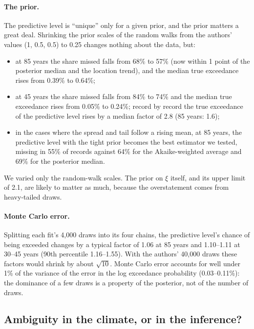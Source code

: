 \documentclass[11pt]{article}
\begin{document}
\paragraph{The prior.}\label{sec:pred-prior}

The predictive level is ``unique'' only for a given prior, and the prior matters a great deal.
Shrinking the prior scales of the random walks from the authors' values (1, 0.5, 0.5) to 0.25
changes nothing about the data, but:
\begin{itemize}
\item at 85 years the share missed falls from 68\% to 57\% (now within 1 point of the posterior
  median and the location trend), and the median true exceedance rises from 0.39\% to 0.64\%;
\item at 45 years the share missed falls from 84\% to 74\% and the median true exceedance rises from
  0.05\% to 0.24\%; record by record the true exceedance of the predictive level rises by a median
  factor of 2.8 (85 years: 1.6);
\item in the cases where the spread and tail follow a rising mean, at 85 years, the predictive level
  with the tight prior becomes the best estimator we tested, missing in 55\% of records against 64\%
  for the Akaike-weighted average and 69\% for the posterior median.
\end{itemize}
We varied only the random-walk scales. The prior on $\xi$ itself, and its upper limit of 2.1, are
likely to matter as much, because the overstatement comes from heavy-tailed draws.

\paragraph{Monte Carlo error.}

Splitting each fit's 4,000 draws into its four chains, the predictive level's chance of being
exceeded changes by a typical factor of 1.06 at 85 years and 1.10--1.11 at 30--45 years (90th
percentile 1.16--1.55). With the authors' 40,000 draws these factors would shrink by about
$\sqrt{10}$. Monte Carlo error accounts for well under 1\% of the variance of the error in the
log exceedance probability (0.03--0.11\%): the dominance of a few draws is a property of the posterior, not of
the number of draws.

\subsection{Ambiguity in the climate, or in the inference?}\label{sec:pred-ambiguity}
\end{document}
